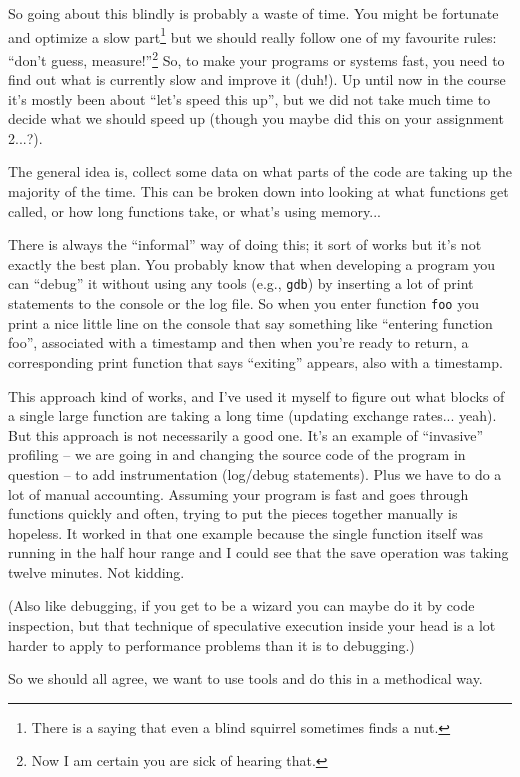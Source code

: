 \documentclass[a4paper]{report}
\begin{document}
So going about this blindly is probably a waste of time. You might be fortunate and optimize a slow part\footnote{There is a saying that even a blind squirrel sometimes finds a nut.} but we should really follow one of my favourite rules: ``don't guess, measure!''\footnote{Now I am certain you are sick of hearing that.} So, to make your programs or systems fast, you need to find out what is currently slow and improve it (duh!). Up until now in the course it's mostly been about ``let's speed this up'', but we did not take much time to decide what we should speed up (though you maybe did this on your assignment 2...?).

The general idea is, collect some data on what parts of the code are taking up the majority of the time. This can be broken down into looking at what functions get called, or how long functions take, or what's using memory...

There is always the ``informal'' way of doing this; it sort of works but it's not exactly the best plan. You probably know that when developing a program you can ``debug'' it without using any tools (e.g., \texttt{gdb}) by inserting a lot of print statements to the console or the log file. So when you enter function \texttt{foo} you print a nice little line on the console that say something like ``entering function foo'', associated with a timestamp and then when you're ready to return, a corresponding print function that says ``exiting'' appears, also with a timestamp.

This approach kind of works, and I've used it myself to figure out what blocks of a single large function are taking a long time (updating exchange rates... yeah). But this approach is not necessarily a good one.  It's an example of ``invasive'' profiling -- we are going in and changing the source code of the program in question -- to add instrumentation (log/debug statements). Plus we have to do a lot of manual accounting. Assuming your program is fast and goes through functions quickly and often, trying to put the pieces together manually is hopeless. It worked in that one example because the single function itself was running in the half hour range and I could see that the save operation was taking twelve minutes. Not kidding. 

(Also like debugging, if you get to be a wizard you can maybe do it by code inspection, but that technique of speculative execution inside your head is a lot harder to apply to performance problems than it is to debugging.)

So we should all agree, we want to use tools and do this in a methodical way.
\end{document}
